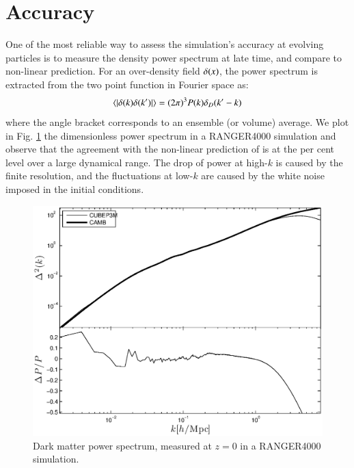 \section{Accuracy}
\label{sec:accuracy}
 
One of the most reliable way to assess the simulation's accuracy at evolving particles
is to measure the density power spectrum at late time, and compare to non-linear prediction. 
For an over-density field $\delta({\bf \it x})$, the power spectrum is extracted from the two point function in Fourier space as:
\begin{eqnarray}
\langle | \delta ({\bf \it k}) \delta ({\bf \it k'}) | \rangle = (2\pi)^{3}P(k)\delta_{D}({\bf \it k'} - {\bf \it k})
\label{eq:power}
\end{eqnarray}
where the angle bracket corresponds to an ensemble (or volume) average.
We plot in Fig. \ref{fig:power_highres} the dimensionless power spectrum in a RANGER4000 simulation and
observe that the agreement with the non-linear prediction of \cite{Lewis:1999bs} is at the per cent level over a large dynamical range.
The drop of power at high-$k$ is caused by the finite resolution, and the fluctuations at low-$k$ are caused by the white noise imposed
in the initial conditions. 

\begin{figure}%
  \begin{center}
    \includegraphics[width=5.2in]{graphs/power_highres.eps}
  \caption{Dark matter power spectrum, measured at $z=0$ in a RANGER4000 simulation.
    \label{fig:power_highres}}
\end{center}
\end{figure}

